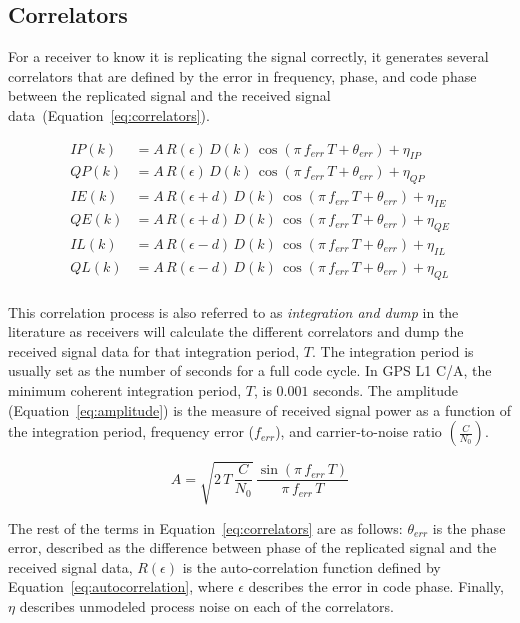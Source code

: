 \subsection{Correlators}
For a receiver to know it is replicating the signal correctly, it generates several correlators that are defined by the error in frequency, phase, and code phase between the replicated signal and the received signal data~(Equation~\ref{eq:correlators}).

\begin{equation}\label{eq:correlators}
    \begin{split}
        IP(k) & = A\,R(\epsilon)\,D(k)\,\cos\left(\pi \,f_{err}\,T + \theta_{err}\right) + \eta_{IP}\\
        QP(k) & = A\,R(\epsilon)\,D(k)\,\cos\left(\pi \,f_{err}\,T + \theta_{err}\right) + \eta_{QP}\\
        IE(k) & = A\,R(\epsilon + d)\,D(k)\,\cos\left(\pi \,f_{err}\,T + \theta_{err}\right) + \eta_{IE}\\
        QE(k) & = A\,R(\epsilon + d)\,D(k)\,\cos\left(\pi \,f_{err}\,T + \theta_{err}\right) + \eta_{QE}\\
        IL(k) & = A\,R(\epsilon - d)\,D(k)\,\cos\left(\pi \,f_{err}\,T + \theta_{err}\right) + \eta_{IL}\\
        QL(k) & = A\,R(\epsilon - d)\,D(k)\,\cos\left(\pi \,f_{err}\,T + \theta_{err}\right) + \eta_{QL}\\
    \end{split}
\end{equation}

This correlation process is also referred to as \textit{integration and dump} in the literature as receivers will calculate the different correlators and dump the received signal data for that integration period, \(T\). The integration period is usually set as the number of seconds for a full code cycle. In GPS L1 C/A, the minimum coherent integration period, \(T\), is \(0.001\) seconds. The amplitude (Equation~\ref{eq:amplitude}) is the measure of received signal power as a function of the integration period, frequency error (\(f_{err}\)), and carrier-to-noise ratio \(\left(\frac{C}{N_0}\right)\).

\begin{equation}\label{eq:amplitude}
    A = \sqrt{2\,T\,\frac{C}{N_0}}\, \frac{\sin\left(\pi \, f_{err} \, T \right)}{\pi \, f_{err} \, T}
\end{equation}

The rest of the terms in Equation~\ref{eq:correlators} are as follows: \(\theta_{err}\) is the phase error, described as the difference between phase of the replicated signal and the received signal data, \(R(\epsilon)\) is the auto-correlation function defined by Equation~\ref{eq:autocorrelation}, where \(\epsilon \) describes the error in code phase. Finally, \(\eta \) describes unmodeled process noise on each of the correlators.

